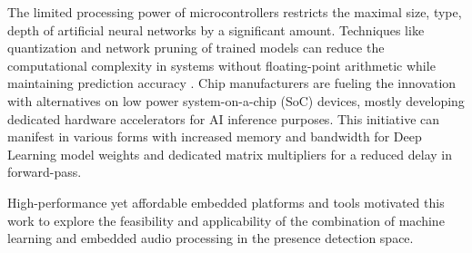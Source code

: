 The limited processing power of microcontrollers restricts the maximal size, type, depth of artificial neural networks by a significant amount. Techniques like quantization and network pruning of trained models can reduce the computational complexity in systems without floating-point arithmetic while maintaining prediction accuracy \cite{han2016deep_quant_prun}.
Chip manufacturers are fueling the innovation with alternatives on low power system-on-a-chip (SoC) devices, mostly developing dedicated hardware accelerators for AI inference purposes. This initiative can manifest in various forms with increased memory and bandwidth for Deep Learning model weights and dedicated matrix multipliers for a reduced delay in forward-pass.

High-performance yet affordable embedded platforms and tools motivated this work to explore the feasibility and applicability of the combination of machine learning and embedded audio processing in the presence detection space.
